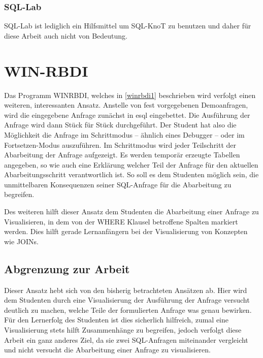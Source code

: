\subsubsection{SQL-Lab}

SQL-Lab ist lediglich ein Hilfsmittel um SQL-KnoT zu benutzen und daher für diese Arbeit auch nicht von Bedeutung. 

\section{WIN-RBDI}

Das Programm WINRBDI, welches in \ref{winrbdi1} beschrieben wird verfolgt einen weiteren, interessanten Ansatz. Anstelle von fest vorgegebenen Demoanfragen, wird die eingegebene Anfrage zunächst in esql eingebettet. Die Ausführung der Anfrage wird dann Stück für Stück durchgeführt. Der Student hat also die Möglichkeit die Anfrage im Schrittmodus -- ähnlich eines Debugger -- oder im Fortsetzen-Modus auszuführen. Im Schrittmodus wird jeder Teilschritt der Abarbeitung der Anfrage aufgezeigt. Es werden temporär erzeugte Tabellen angegeben, so wie auch eine Erklärung welcher Teil der Anfrage für den aktuellen Abarbeitungsschritt verantwortlich ist. So soll es dem Studenten möglich sein, die unmittelbaren Konsequenzen seiner SQL-Anfrage für die Abarbeitung zu begreifen. 

Des weiteren hilft dieser Ansatz dem Studenten die Abarbeitung einer Anfrage zu Visualisieren, in dem von der WHERE Klausel betroffene Spalten markiert werden. Dies hilft gerade Lernanfängern bei der Visualisierung von Konzepten wie JOINs.

\subsection*{Abgrenzung zur Arbeit}

Dieser Ansatz hebt sich von den bisherig betrachteten Ansätzen ab. Hier wird dem Studenten durch eine Visualisierung der Ausführung der Anfrage versucht deutlich zu machen, welche Teile der formulierten Anfrage was genau bewirken. Für den Lernerfolg des Studenten ist dies sicherlich hilfreich, zumal eine Visualisierung stets hilft Zusammenhänge zu begreifen, jedoch verfolgt diese Arbeit ein ganz anderes Ziel, da sie zwei SQL-Anfragen miteinander vergleicht und nicht versucht die Abarbeitung einer Anfrage zu visualisieren.
